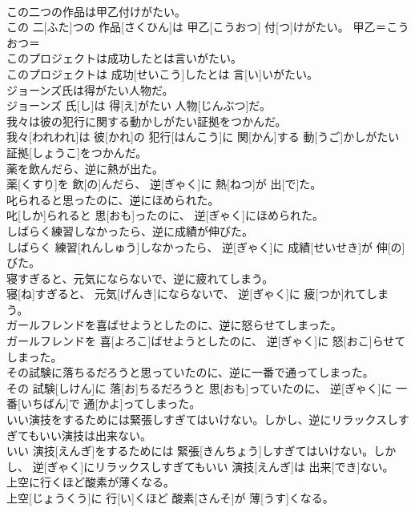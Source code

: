 \documentclass[8pt]{extreport}
\begin{document}
\begin{CJK}{UTF8}{min}
\\	この二つの作品は甲乙付けがたい。	
\\	この 二[ふた]つの 作品[さくひん]は 甲乙[こうおつ] 付[つ]けがたい。	甲乙＝こうおつ＝ 
\\	このプロジェクトは成功したとは言いがたい。	
\\	このプロジェクトは 成功[せいこう]したとは 言[い]いがたい。	
\\	ジョーンズ氏は得がたい人物だ。	
\\	ジョーンズ 氏[し]は 得[え]がたい 人物[じんぶつ]だ。	
\\	我々は彼の犯行に関する動かしがたい証拠をつかんだ。	
\\	我々[われわれ]は 彼[かれ]の 犯行[はんこう]に 関[かん]する 動[うご]かしがたい 証拠[しょうこ]をつかんだ。	
\\	薬を飲んだら、逆に熱が出た。	
\\	薬[くすり]を 飲[の]んだら、 逆[ぎゃく]に 熱[ねつ]が 出[で]た。	
\\	叱られると思ったのに、逆にほめられた。	
\\	叱[しか]られると 思[おも]ったのに、 逆[ぎゃく]にほめられた。	
\\	しばらく練習しなかったら、逆に成績が伸びた。	
\\	しばらく 練習[れんしゅう]しなかったら、 逆[ぎゃく]に 成績[せいせき]が 伸[の]びた。	
\\	寝すぎると、元気にならないで、逆に疲れてしまう。	
\\	寝[ね]すぎると、 元気[げんき]にならないで、 逆[ぎゃく]に 疲[つか]れてしまう。	
\\	ガールフレンドを喜ばせようとしたのに、逆に怒らせてしまった。	
\\	ガールフレンドを 喜[よろこ]ばせようとしたのに、 逆[ぎゃく]に 怒[おこ]らせてしまった。	
\\	その試験に落ちるだろうと思っていたのに、逆に一番で通ってしまった。	
\\	その 試験[しけん]に 落[お]ちるだろうと 思[おも]っていたのに、 逆[ぎゃく]に 一番[いちばん]で 通[かよ]ってしまった。	
\\	いい演技をするためには緊張しすぎてはいけない。しかし、逆にリラックスしすぎてもいい演技は出来ない。	
\\	いい 演技[えんぎ]をするためには 緊張[きんちょう]しすぎてはいけない。しかし、 逆[ぎゃく]にリラックスしすぎてもいい 演技[えんぎ]は 出来[でき]ない。	
\\	上空に行くほど酸素が薄くなる。	
\\	上空[じょうくう]に 行[い]くほど 酸素[さんそ]が 薄[うす]くなる。	

\end{CJK}
\end{document}

